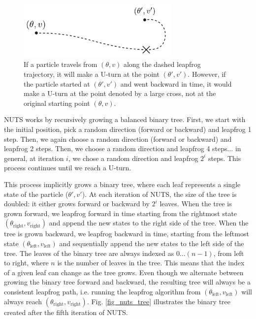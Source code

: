 \documentclass[12pt]{article}
\begin{document}
\begin{figure}[H]
\centering
\includegraphics[width=8cm]{illustrations/nuts_uturn_detailed_balance.pdf}
\caption{If a particle travels from $(\theta, v)$ along the dashed leapfrog trajectory, it will make a U-turn at the point $(\theta', v')$. However, if the particle started at $(\theta', v')$ and went backward in time, it would make a U-turn at the point denoted by a large cross, not at the original starting point $(\theta, v)$.}
\label{fig_nuts_uturn_detailed_balance}
\end{figure}

NUTS works by recursively growing a balanced binary tree. First, we start with the initial position, pick a random direction (forward or backward) and leapfrog 1 step. Then, we again choose a random direction (forward or backward) and leapfrog 2 steps. Then, we choose a random direction and leapfrog 4 steps... in general, at iteration $i$, we chose a random direction and leapfrog $2^i$ steps. This process continues until we reach a U-turn.

This process implicitly grows a binary tree, where each leaf represents a single state of the particle ($\theta', v'$). At each iteration of NUTS, the size of the tree is doubled: it either grows forward or backward by $2^i$ leaves. When the tree is grown forward, we leapfrog forward in time starting from the rightmost state $(\theta_\text{right}, v_\text{right})$ and append the new states to the right side of the tree. When the tree is grown backward, we leapfrog backward in time, starting from the leftmost state $(\theta_\text{left}, v_\text{left})$ and sequentially append the new states to the left side of the tree. The leaves of the binary tree are always indexed as $0 \ldots (n-1)$, from left to right, where $n$ is the number of leaves in the tree. This means that the index of a given leaf can change as the tree grows. Even though we alternate between growing the binary tree forward and backward, the resulting tree will always be a consistent leapfrog path, i.e. running the leapfrog algorithm from $(\theta_\text{left}, v_\text{left})$ will always reach $(\theta_\text{right}, v_\text{right})$. Fig. \ref{fig_nuts_tree} illustrates the binary tree created after the fifth iteration of NUTS.
\end{document}
